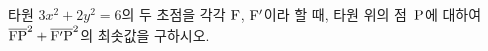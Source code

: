 타원 $3x^2+2y^2=6$의 두 초점을 각각 $\mathrm{F}$, $\mathrm{F}'$이라 할 때, 타원 위의 점~$\mathrm{P}$에 대하여 $\overline{\mathrm{FP}}^2+\overline{\mathrm{F'P}}^2$의 최솟값을 구하시오.
